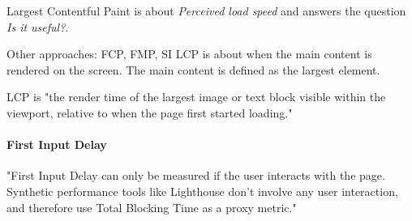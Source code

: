 Largest Contentful Paint is about \textit{Perceived load speed} and answers the question \textit{Is it useful?}.

Other approaches: FCP, FMP, SI
LCP is about when the main content is rendered on the screen.
The main content is defined as the largest element.

LCP is "the render time of the largest image or text block visible within the viewport, relative to when the page first started loading."
















 





\paragraph{First Input Delay}








"First Input Delay can only be measured if the user interacts with the page. Synthetic performance tools like Lighthouse don't involve any user interaction, and therefore use Total Blocking Time as a proxy metric."




